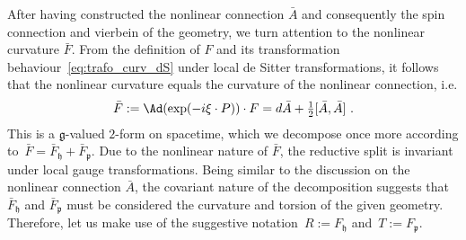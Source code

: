 \documentclass[11pt]{article}
\begin{document}
After having constructed the nonlinear connection $\bar{A}$ and 
consequently the spin connection and vierbein of the geometry, we 
turn attention to the nonlinear curvature $\bar{F}$. From the 
definition of $F$ and its transformation 
behaviour~\eqref{eq:trafo_curv_dS} under local de Sitter 
transformations, it follows that the nonlinear curvature equals 
the curvature of the nonlinear connection, i.e.
%
\begin{equation}
\label{eq:F_nonlin}
	\bar{F} := \Ad(\exp(-i\xi\cdot P)) \cdot F = d\bar{A} + 
	\tfrac{1}{2}[\bar{A},\bar{A}]~.
\end{equation}
This is a $\mathfrak{g}$-valued $2$-form on spacetime, which we 
decompose once more according to~$\bar{F} = \bar{F}_\mathfrak{h} 
+ \bar{F}_\mathfrak{p}$. Due to the nonlinear nature of 
$\bar{F}$, the reductive split is invariant under local gauge 
transformations. Being similar to the discussion on the nonlinear 
connection $\bar{A}$, the covariant nature of the decomposition 
suggests that $\bar{F}_\mathfrak{h}$ and $\bar{F}_\mathfrak{p}$ 
must be considered the curvature and torsion of the given 
geometry.  Therefore, let us make use of the suggestive 
notation~$R := F_\mathfrak{h}$ and~$T := F_\mathfrak{p}$.
\end{document}
